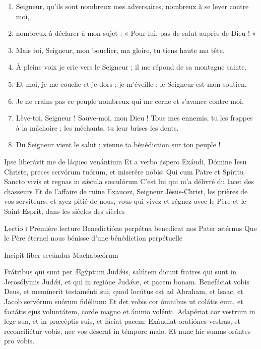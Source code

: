 \documentclass[twoside]{article}
\begin{document}
\begin{paracol}[1]{2}
\begin{enumerate}[wide, itemsep=0mm, labelwidth=!, labelindent=0pt, label=\color{gregoriocolor}\theenumi]
\item Seigneur, qu'ils sont nombreux mes adversaires, nombreux à se lever contre moi,
\item nombreux à déclarer à mon sujet : « Pour lui, pas de salut auprès de Dieu ! »
\item Mais toi, Seigneur, mon bouclier, ma gloire, tu tiens haute ma tête.
\item À pleine voix je crie vers le Seigneur ; il me répond de sa montagne sainte.
\item Et moi, je me couche et je dors ; je m'éveille : le Seigneur est mon soutien.
\item Je ne crains pas ce peuple nombreux qui me cerne et s'avance contre moi.
\item Lève-toi, Seigneur ! Sauve-moi, mon Dieu ! Tous mes ennemis, tu les frappes à la mâchoire ; les méchants, tu leur brises les dents.
\item Du Seigneur vient le salut ; vienne ta bénédiction sur ton peuple !
\end{enumerate}

\switchcolumn*

\versiculusabsolutio
	{Ipse liberávit me de láqueo venántium}
	{Et a verbo áspero}
	{Exáudi, Dómine Iesu Christe, preces servórum tuórum, et miserére nobis: Qui cum Patre et Spíritu Sancto vivis et regnas in sǽcula sæculórum}
	{C’est lui qui m’a délivré du lacet des chasseurs}
	{Et de l’affaire de ruine}
	{Exaucez, Seigneur Jésus-Christ, les prières de vos serviteurs, et ayez pitié de nous, vous qui vivez et régnez avec le Père et le Saint-Esprit, dans les siècles des siècles}

\lectioresponsorium
	{Lectio \textsc{i}}
	{Première lecture}
	{Benedictióne perpétua benedícat nos Pater ætérnus}
	{Que le Père éternel nous bénisse d'une bénédiction perpétuelle}
	{
		Incipit liber secúndus Machabæórum

		Frátribus qui sunt per Ægýptum Judǽis, salútem dicunt fratres qui sunt in Jerosólymis Judǽi, et qui in regióne Judǽæ, et pacem bonam.
		Benefáciat vobis Deus, et memínerit testaménti sui, quod locútus est ad Abraham, et Isaac, et Jacob servórum suórum fidélium:
		Et det vobis cor ómnibus ut colátis eum, et faciátis ejus voluntátem, corde magno et ánimo volénti.
		Adapériat cor vestrum in lege sua, et in præcéptis suis, et fáciat pacem;
		Exáudiat oratiónes vestras, et reconciliétur vobis, nec vos déserat in témpore malo.
		Et nunc hic sumus orántes pro vobis.
	}
	{	
	
}
\end{paracol}
\end{document}
